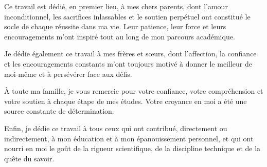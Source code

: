 \begin{dedication}
Ce travail est d\'{e}di\'{e}, en premier lieu, \`{a} mes chers parents, dont l'amour inconditionnel, les sacrifices inlassables et le soutien perp\'{e}tuel ont constitu\'{e} le socle de chaque r\'{e}ussite dans ma vie. Leur patience, leur force et leurs encouragements m'ont inspir\'{e} tout au long de mon parcours acad\'{e}mique.

Je d\'{e}die \'{e}galement ce travail \`{a} mes fr\`{e}res et s\oe{}urs, dont l'affection, la confiance et les encouragements constants m'ont toujours motiv\'{e} \`{a} donner le meilleur de moi-m\^{e}me et \`{a} pers\'{e}v\'{e}rer face aux d\'{e}fis.

\`{A} toute ma famille, je vous remercie pour votre confiance, votre compr\'{e}hension et votre soutien \`{a} chaque \'{e}tape de mes \'{e}tudes. Votre croyance en moi a \'{e}t\'{e} une source constante de d\'{e}termination.

Enfin, je d\'{e}die ce travail \`{a} tous ceux qui ont contribu\'{e}, directement ou indirectement, \`{a} mon \'{e}ducation et \`{a} mon \'{e}panouissement personnel, et qui ont nourri en moi le go\^{u}t de la rigueur scientifique, de la discipline technique et de la qu\^{e}te du savoir.
\end{dedication}
